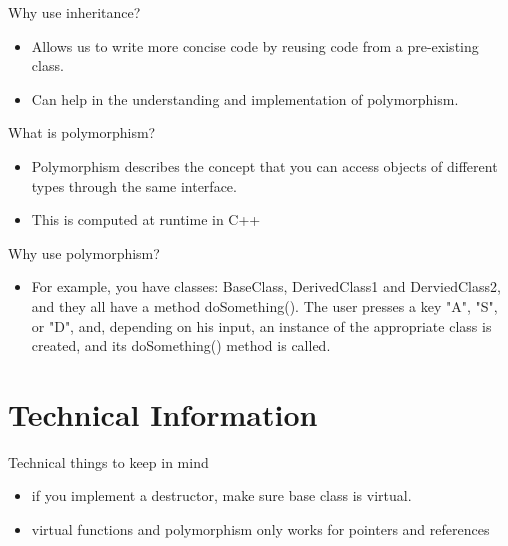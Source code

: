 \documentclass{beamer}
\begin{document}
\begin{frame}{Why use inheritance?}
    \begin{itemize} 
    \item Allows us to write more concise code by reusing code from a pre-existing class.
    \item Can help in the understanding and implementation of polymorphism.
    \end{itemize}
    \end{frame}


\begin{frame}{What is polymorphism?}
    \begin{itemize} 
    \item Polymorphism describes the concept that you can 
    access objects of different types through the same interface.
    \item This is computed at runtime in C++
    \end{itemize}
\end{frame}


\begin{frame}{Why use polymorphism?}
    \begin{itemize} 
    \item For example, you have classes: BaseClass, DerivedClass1 and DerviedClass2, and they 
    all have a method doSomething(). The user presses a key "A", "S", or "D", and,
    depending on his input, an instance of the appropriate class is created, and
    its doSomething() method is called.
    \end{itemize}
\end{frame}


\section{Technical Information}
    \begin{frame}{Technical things to keep in mind}
    \begin{itemize}
    \item if you implement a destructor, make sure base class is virtual.
    \item virtual functions and polymorphism only works for pointers and references
    \end{itemize}  
\end{frame}
\end{document}
